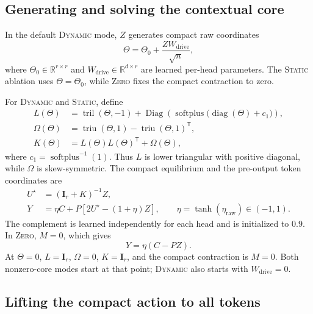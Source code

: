 \documentclass[10pt]{article}
\newcommand{\R}{\mathbb{R}}
\newcommand{\I}{\mathbf{I}}
\newcommand{\T}{\mathsf{T}}
\newcommand{\diag}{\operatorname{Diag}}
\newcommand{\tril}{\operatorname{tril}}
\newcommand{\triu}{\operatorname{triu}}
\begin{document}
\subsection{Generating and solving the contextual core}
\label{sec:accretive-core}

In the default \textsc{Dynamic} mode, $Z$ generates compact raw coordinates
\begin{equation}
    \Theta = \Theta_0 + \frac{ZW_{\mathrm{drive}}}{\sqrt{n}},
\label{eq:dynamic-coordinates}
\end{equation}
where $\Theta_0\in\R^{r\times r}$ and
$W_{\mathrm{drive}}\in\R^{d\times r}$ are learned per-head parameters.  The
\textsc{Static} ablation uses $\Theta=\Theta_0$, while \textsc{Zero} fixes the
compact contraction to zero.

For \textsc{Dynamic} and \textsc{Static}, define
\begin{align}
    L(\Theta) & = \tril(\Theta,-1)+
        \diag\!\left(\operatorname{softplus}
        \bigl(\operatorname{diag}(\Theta)+c_1\bigr)\right), \\
    \Omega(\Theta) & = \triu(\Theta,1)-\triu(\Theta,1)^\T, \\
    K(\Theta) & = L(\Theta)L(\Theta)^\T+\Omega(\Theta),
\label{eq:accretive-parameterization}
\end{align}
where $c_1=\operatorname{softplus}^{-1}(1)$.  Thus $L$ is lower triangular
with positive diagonal, while $\Omega$ is skew-symmetric.  The compact
equilibrium and the pre-output token coordinates are
\begin{align}
    U^\star &=(\I_r+K)^{-1}Z, \\
    Y &= \eta C+P\left[2U^\star-(1+\eta)Z\right],
    \qquad \eta=\tanh(\eta_{\mathrm{raw}})\in(-1,1).
\label{eq:equilibrium-readout}
\end{align}
The complement is learned independently for each head and is initialized to
$0.9$.  In \textsc{Zero}, $M=0$, which gives
\begin{equation}
    Y=\eta(C-PZ).
\label{eq:zero-core}
\end{equation}
At $\Theta=0$, $L=\I_r$, $\Omega=0$, $K=\I_r$, and the compact contraction is
$M=0$.  Both nonzero-core modes start at that point; \textsc{Dynamic} also
starts with $W_{\mathrm{drive}}=0$.

\subsection{Lifting the compact action to all tokens}
\end{document}
